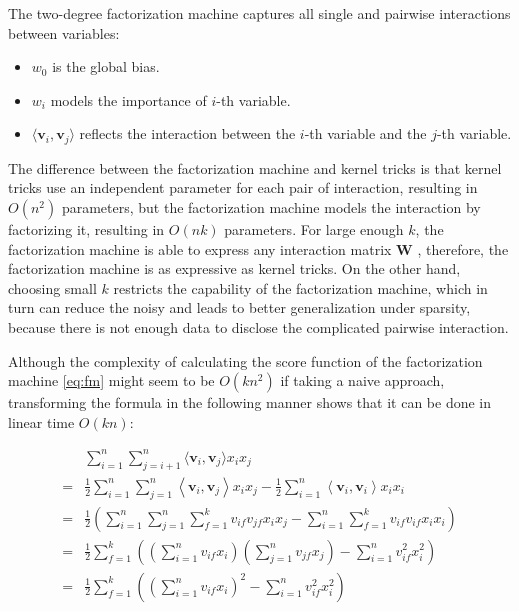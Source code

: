         The two-degree factorization machine captures all single and pairwise interactions between variables:

        \begin{itemize}
            \item $w_0$ is the global bias.
            \item $w_i$ models the importance of $i$-th variable.
            \item $\langle \bm{v}_i, \bm{v}_j \rangle$ reflects the interaction
                between the $i$-th variable and the $j$-th variable.
        \end{itemize}

        The difference between the factorization machine and kernel tricks is that
        kernel tricks use an independent parameter for each pair of interaction, resulting in $O(n^2)$ parameters,
        but the factorization machine models the interaction by factorizing it, resulting in $O(nk)$ parameters.
        For large enough $k$, the factorization machine is able to express any interaction matrix $\bm{W}$ \cite{Rendle2010},
        therefore, the factorization machine is as expressive as kernel tricks.
        On the other hand, choosing small $k$ restricts the capability of the factorization machine,
        which in turn can reduce the noisy and leads to better generalization under sparsity,
        because there is not enough data to disclose the complicated pairwise interaction.

        Although the complexity of calculating the score function of the factorization machine \ref{eq:fm}
        might seem to be $O(kn^2)$ if taking a naive approach,
        transforming the formula in the following manner shows that it can be done in linear time $O(kn)$:

        \begin{align*}
        & \sum_{i=1}^n\sum_{j=i+1}^n \langle \bm{v}_i, \bm{v}_j \rangle x_ix_j \\
        =& \frac { 1} { 2} \sum _ { i = 1} ^ { n } \sum _ { j = 1} ^ { n } \left\langle \bm { v } _ { i } ,\bm { v } _ { j } \right\rangle x _ { i } x _ { j } - \frac { 1} { 2} \sum _ { i = 1} ^ { n } \left\langle \bm { v } _ { i } ,\bm { v } _ { i } \right\rangle x _ { i } x _ { i } \\
        =& \frac { 1} { 2} \left( \sum _ { i = 1} ^ { n } \sum _ { j = 1} ^ { n } \sum _ { f = 1} ^ { k } v _ { if } v _ { jf} x _ { i } x _ { j } - \sum _ { i = 1} ^ { n } \sum _ { f = 1} ^ { k } v _ { if } v _ { if } x _ { i } x _ { i } \right) \\
        =& \frac { 1} { 2} \sum _ { f = 1} ^ { k } \left( \left( \sum _ { i = 1} ^ { n } v _ { if } x _ { i } \right) \left( \sum _ { j = 1} ^ { n } v _ { jf } x _ { j } \right) - \sum _ { i = 1} ^ { n } v _ { if } ^ { 2} x _ { i } ^ { 2} \right) \\
        =& \frac { 1} { 2} \sum _ { f = 1} ^ { k } \left( \left( \sum _ { i = 1} ^ { n } v _ { if } x _ { i } \right) ^ { 2} - \sum _ { i = 1} ^ { n } v _ { if } ^ { 2} x _ { i } ^ { 2} \right)
        \end{align*}

